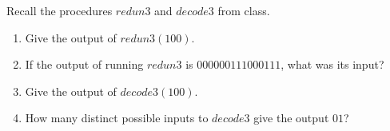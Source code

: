 
Recall the procedures $redun3$ and $decode3$ from class.

\begin{enumerate}
\item  Give the output of $redun3(100)$.
\item  If the output of running $redun3$ is $000000111000111$, what was its input?
\item  Give the output of $decode3(100)$.
\item  How many distinct possible inputs to $decode3$ give the output $01$?
\end{enumerate}